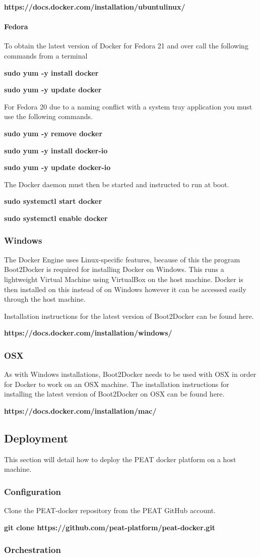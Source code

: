 \documentclass[10pt,a4paper]{article}
\begin{document}
\centerline{\textbf{https://docs.docker.com/installation/ubuntulinux/}}

\paragraph{Fedora}
To obtain the latest version of Docker for Fedora 21 and over call the following commands from a terminal

\centerline{\textbf{sudo yum -y install docker}}
\centerline{\textbf{sudo yum -y update docker}}

For Fedora 20 due to a naming conflict with a system tray application you must use the following commands.

\centerline{\textbf{sudo yum -y remove docker}}
\centerline{\textbf{sudo yum -y install docker-io}}
\centerline{\textbf{sudo yum -y update docker-io}}

The Docker daemon must then be started and instructed to run at boot.

\centerline{\textbf{sudo systemctl start docker}}
\centerline{\textbf{sudo systemctl enable docker}}

\subsubsection{Windows}

The Docker Engine uses Linux-specific features, because of this the program Boot2Docker is required for installing Docker on Windows. This runs a lightweight Virtual Machine using VirtualBox on the host machine. Docker is then installed on this instead of on Windows however it can be accessed easily through the host machine.

Installation instructions for the latest version of Boot2Docker can be found here.
\centerline{\textbf{https://docs.docker.com/installation/windows/}}

\subsubsection{OSX}
As with Windows installations, Boot2Docker needs to be used with OSX in order for Docker to work on an OSX machine.
The installation instructions for installing the latest version of Boot2Docker on OSX can be found here.
\centerline{\textbf{https://docs.docker.com/installation/mac/}}

\newpage
 
\subsection{Deployment}
This section will detail how to deploy the PEAT docker platform on a host machine.

\subsubsection{Configuration}
Clone the PEAT-docker repository from the PEAT GitHub account.\\
\centerline{\textbf{git clone https://github.com/peat-platform/peat-docker.git}}


\subsubsection{Orchestration}
\end{document}
